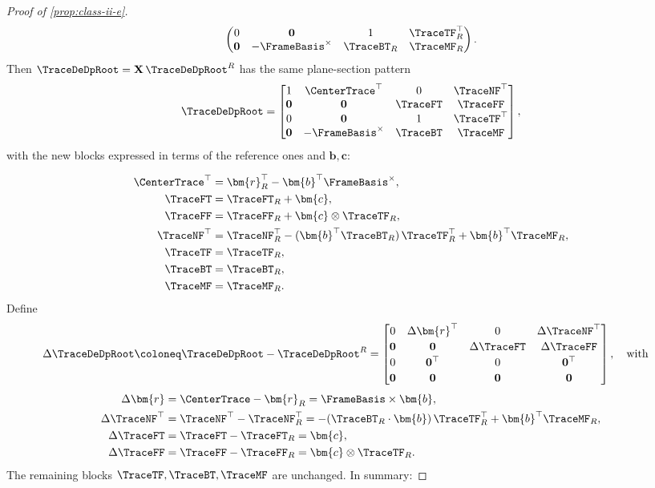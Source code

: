 \begin{proof}[Proof of \cref{prop:class-ii-e}]
\begin{equation*}
\begin{pmatrix}
    0          & \mathbf{0} & 1 & {\TraceTF}_R^\top \\
    \mathbf{0} & -\FrameBasis^\times & {\TraceBT}_R & {\TraceMF}_R
  \end{pmatrix}.
\end{equation*}
Then \(\TraceDeDpRoot = \mathbf{X}\,\TraceDeDpRoot^R\) has the same plane-section
pattern
\begin{equation*}
  \TraceDeDpRoot =
  \begin{bmatrix}
    1          & \CenterTrace^\top & 0 & \TraceNF^\top \\
    \mathbf{0} & \mathbf{0}              & \TraceFT & \TraceFF \\
    0          & \mathbf{0}              & 1 & \TraceTF^\top \\
    \mathbf{0} & -\FrameBasis^\times     & \TraceBT & \TraceMF
  \end{bmatrix},
\end{equation*}
with the new blocks expressed in terms of the reference ones and
\(\bm{b},\bm{c}\):

\begin{align*}
  \CenterTrace^\top
    &= \bm{r}_R^\top - \bm{b}^\top \FrameBasis^\times, \\ %
  \TraceFT
    &= {\TraceFT}_R + \bm{c}, \\ %
  \TraceFF
    &= {\TraceFF}_R + \bm{c}\otimes{\TraceTF}_R, \\ %
  \TraceNF^\top
    &= {\TraceNF}_R^\top
       - (\bm{b}^\top {\TraceBT}_R)\,{\TraceTF}_R^\top
       + \bm{b}^\top {\TraceMF}_R, \\%
  \TraceTF
    &= {\TraceTF}_R, \\%
  \TraceBT
    &= {\TraceBT}_R, \\%
  \TraceMF
    &= {\TraceMF}_R.
\end{align*}
%
Define
\[
  \Delta \TraceDeDpRoot \coloneq \TraceDeDpRoot - \TraceDeDpRoot^R =
  \begin{bmatrix}
    0 & \Delta \bm{r}^\top & 0 & \Delta \TraceNF^\top \\[2pt]
    \mathbf{0} & \mathbf{0} & \Delta \TraceFT & \Delta \TraceFF \\[2pt]
    0 & \mathbf{0}^\top & 0 & \mathbf{0}^\top \\[2pt]
    \mathbf{0} & \mathbf{0} & \mathbf{0} & \mathbf{0}
  \end{bmatrix},
\quad\text{with}\quad
\]
\begin{align*}
  \Delta \bm{r}
    &= \CenterTrace - \bm{r}_R
     = \FrameBasis\times\bm{b}, \\ %
  \Delta \TraceNF^\top
    &= \TraceNF^\top - {\TraceNF}_R^\top
     = -({\TraceBT}_R \cdot \bm{b})\,{\TraceTF}_R^\top
       + \bm{b}^\top {\TraceMF}_R, \\ %
  \Delta \TraceFT
    &= \TraceFT - {\TraceFT}_R = \bm{c}, \\ %
  \Delta \TraceFF
    &= \TraceFF - {\TraceFF}_R = \bm{c}\otimes {\TraceTF}_R.
\end{align*}
The remaining blocks
\(\TraceTF,\TraceBT,\TraceMF\) are unchanged. 
In summary:


\end{proof}
